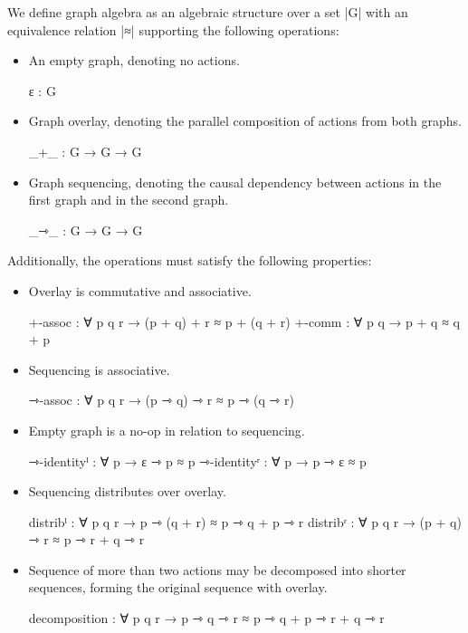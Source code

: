We define graph algebra as an algebraic structure over a set |G| with an equivalence relation |≈| supporting the following operations:
\begin{itemize}
\item{An empty graph, denoting no actions.
\begin{code}
ε : G
\end{code}}
\item{Graph overlay, denoting the parallel composition of actions from both graphs.
\begin{code}
_+_ : G → G → G
\end{code}}
\item{Graph sequencing, denoting the causal dependency between actions in the first graph and in the second graph.
\begin{code}
_⇾_ : G → G → G
\end{code}
}
\end{itemize}

Additionally, the operations must satisfy the following properties:

\begin{itemize}
\item{Overlay is commutative and associative.
\begin{code}
  +-assoc : ∀ p q r → (p + q) + r ≈ p + (q + r)
  +-comm : ∀ p q → p + q ≈ q + p
\end{code}}
\item{Sequencing is associative.
\begin{code}
  ⇾-assoc : ∀ p q r → 
    (p ⇾ q) ⇾ r ≈ p ⇾ (q ⇾ r)
\end{code}}
\item{Empty graph is a no-op in relation to sequencing.
\begin{code}
  ⇾-identityˡ : ∀ p → ε ⇾ p ≈ p
  ⇾-identityʳ : ∀ p → p ⇾ ε ≈ p
\end{code}}
\item{Sequencing distributes over overlay.
\begin{code}
  distribˡ : ∀ p q r → 
    p ⇾ (q + r) ≈ p ⇾ q + p ⇾ r
  distribʳ : ∀ p q r → 
    (p + q) ⇾ r ≈ p ⇾ r + q ⇾ r
\end{code}}
\item{Sequence of more than two actions may be decomposed into shorter sequences, 
forming the original sequence with overlay.
\begin{code}
  decomposition : ∀ p q r → 
                  p ⇾ q ⇾ r ≈ p ⇾ q + p ⇾ r + q ⇾ r
\end{code}}
\end{itemize}

